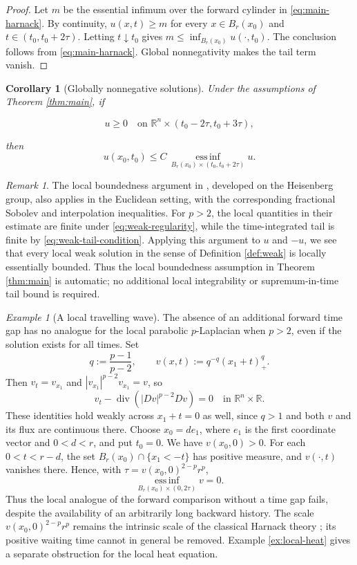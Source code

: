 \documentclass[10pt]{amsart}
\theoremstyle{plain}
\newtheorem{corollary}[lemma]{Corollary}
\theoremstyle{definition}
\theoremstyle{remark}
\newtheorem{remark}[lemma]{Remark}
\newtheorem{example}[lemma]{Example}
\numberwithin{equation}{section}
\newcommand{\R}{\mathbb R}
\begin{document}
\begin{proof}
Let $m$ be the essential infimum over the forward cylinder in
\eqref{eq:main-harnack}. By continuity, $u(x,t)\ge m$ for every
$x\in B_r(x_0)$ and $t\in(t_0,t_0+2\tau)$. Letting $t\downarrow t_0$
gives $m\le\inf_{B_r(x_0)}u(\cdot,t_0)$. The conclusion follows from
\eqref{eq:main-harnack}. Global nonnegativity makes the tail term vanish.
\end{proof}

\begin{corollary}[Globally nonnegative solutions]\label{cor:global}
Under the assumptions of Theorem \ref{thm:main}, if

\[
    u\ge0
    \quad\text{on }\R^n\times(t_0-2\tau,t_0+3\tau),
\]

then
\begin{equation}\label{eq:global-harnack}
u(x_0,t_0)
\le
C\,
\operatorname*{ess\,inf}_{B_r(x_0)\times(t_0,t_0+2\tau)}u.
\end{equation}
\end{corollary}
\begin{remark}
The local boundedness argument in
\cite[Theorem~1.4]{KarTewary}, developed on the Heisenberg group,
also applies in the Euclidean setting, with the corresponding
fractional Sobolev and interpolation inequalities. For $p>2$, the
local quantities in their estimate are finite under
\eqref{eq:weak-regularity}, while the time-integrated tail is finite
by \eqref{eq:weak-tail-condition}. Applying this argument to $u$ and
$-u$, we see that every local weak solution in the sense of
Definition \ref{def:weak} is locally essentially bounded. Thus the
local boundedness assumption in Theorem \ref{thm:main} is automatic;
no additional local integrability or supremum-in-time tail bound
is required.
\end{remark}
\begin{example}[A local travelling wave]\label{ex:local-p-wave}
The absence of an additional forward time gap has no analogue for
the local parabolic $p$-Laplacian when $p>2$, even if the solution
exists for all times. Set
\[
q:=\frac{p-1}{p-2},\qquad
v(x,t):=q^{-q}(x_1+t)_+^q.
\]
Then $v_t=v_{x_1}$ and
$|v_{x_1}|^{p-2}v_{x_1}=v$, so
\[
v_t-\operatorname{div}(|Dv|^{p-2}Dv)=0
\quad\text{in }\R^n\times\R.
\]
These identities hold weakly across $x_1+t=0$ as well, since $q>1$
and both $v$ and its flux are continuous there.
Choose $x_0=d e_1$, where $e_1$ is the first coordinate vector and
$0<d<r$, and put $t_0=0$. We have $v(x_0,0)>0$. For each
$0<t<r-d$, the set $B_r(x_0)\cap\{x_1<-t\}$ has positive measure,
and $v(\cdot,t)$ vanishes there. Hence, with
$\tau=v(x_0,0)^{2-p}r^p$,
\[
\operatorname*{ess\,inf}_{B_r(x_0)\times(0,2\tau)}v=0.
\]
Thus the local analogue of the forward comparison without a time
gap fails, despite the availability of an arbitrarily long backward
history. The scale $v(x_0,0)^{2-p}r^p$ remains the intrinsic scale
of the classical Harnack theory \cite{DGVActa,DGV}; its positive
waiting time cannot in general be removed. Example
\ref{ex:local-heat} gives a separate obstruction for the local heat
equation.
\end{example}
\end{document}
